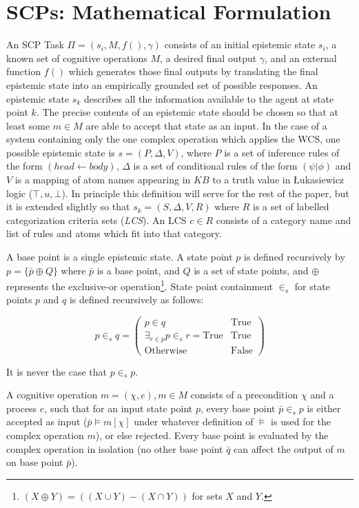 \section{SCPs: Mathematical Formulation}
An SCP Task $\Pi=(s_i, M, f(), \gamma)$ consists of an initial epistemic state $s_i$, a known set of cognitive operations $M$, a desired final output $\gamma$, and an external function $f()$ which generates those final outputs by translating the final epistemic state into an empirically grounded set of possible responses. An epistemic state $s_k$ describes all the information available to the agent at state point $k$. The precise contents of an epistemic state should be chosen so that at least some $m \in M$ are able to accept that state as an input. In the case of a system containing only the one complex operation which applies the WCS, one possible epistemic state is $s=(P,\Delta,V)$, where $P$ is a set of inference rules of the form $(head \leftarrow body)$, $\Delta$ is a set of conditional rules of the form $(\psi|\phi)$ and $V$ is a mapping of atom names appearing in $KB$ to a truth value in \L ukasiewicz logic ($\top,u, \bot$). In principle this definition will serve for the rest of the paper, but it is extended slightly so that $s_k = (S,\Delta,V,R)$ where $R$ is a set of labelled categorization criteria sets (\textit{LCS}). An LCS $ c \in R$ consists of a category name and list of rules and atoms which fit into that category.

A base point is a single epistemic state. A state point $p$ is defined recursively by $p=\{\bar{p} \oplus Q \}$ where $\bar{p}$ is a base point, and $Q$ is a set of state points, and $\oplus$ represents the exclusive-or operation\footnote{$(X \oplus Y) = ((X \cup Y) - (X \cap Y))$ for sets $X$ and $Y$.}. State point containment $\in_s$ for state points $p$ and $q$ is defined recursively as follows:

\[
p \in_s q = \begin{pmatrix} p \in q  & \textrm{True} \\   \exists_{r\in p}p \in_s r = \textrm{True} & \textrm{True}   \\ \textrm{Otherwise} & \textrm{False} \end{pmatrix}
\]

It is never the case that $p \in_s p$.

A cognitive operation $m = (\chi, e), m \in M$ consists of a precondition $\chi$ and a process $e$, such that for an input state point $p$, every base point $\bar{p} \in_s p$ is either accepted as input ($\bar{p} \models m[\chi]$ under whatever definition of $\models$ is used for the complex operation $m$), or else rejected. Every base point is evaluated by the complex operation in isolation (no other base point $\bar{q}$ can affect the output of $m$ on base point $\bar{p}$).

